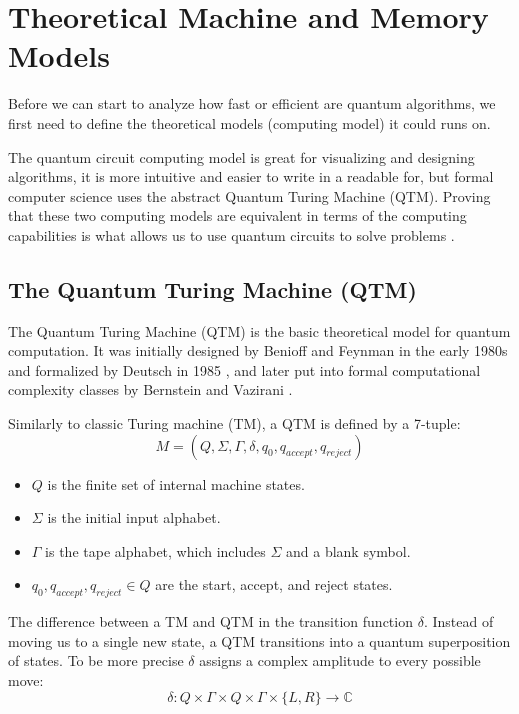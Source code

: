 \section{Theoretical Machine and Memory Models}

Before we can start to analyze how fast or efficient are quantum algorithms, 
we first need to define the theoretical models (computing model) it could runs on. 

%
%
The quantum circuit computing model is great for visualizing and designing algorithms, it is more intuitive and 
easier to write in a readable for, but formal computer science uses the abstract Quantum Turing Machine (QTM). 
Proving that these two computing models are equivalent in terms of the computing capabilities is what allows us to 
use quantum circuits to solve problems \cite{bernstein1997}.

%
%
\subsection{The Quantum Turing Machine (QTM)}

%
%
The Quantum Turing Machine (QTM) is the basic theoretical model for quantum computation. 
It was initially designed by Benioff and Feynman in the early 1980s and formalized by Deutsch in 1985 \cite{deutsch1985}, 
and later put into formal computational complexity classes by Bernstein and Vazirani \cite{bernstein1997}. 

Similarly to classic Turing machine (TM), a QTM is defined by a 7-tuple:
\bigskip
\begin{equation}
    M = (Q, \Sigma, \Gamma, \delta, q_0, q_{accept}, q_{reject})
\end{equation}
\bigskip
\begin{itemize}
    \item $Q$ is the finite set of internal machine states.
    \item $\Sigma$ is the initial input alphabet.
    \item $\Gamma$ is the tape alphabet, which includes $\Sigma$ and a blank symbol.
    \item $q_0, q_{accept}, q_{reject} \in Q$ are the start, accept, and reject states.
\end{itemize}

The difference between a TM and QTM in the transition function $\delta$. 
Instead of moving us to a single new state, a QTM transitions into a quantum superposition of states. 
To be more precise $\delta$ assigns a complex amplitude to every possible move:
%
%
\bigskip
\begin{equation}
    \delta: Q \times \Gamma \times Q \times \Gamma \times \{L, R\} \to \mathbb{C}
\end{equation}
\bigskip
%
%

